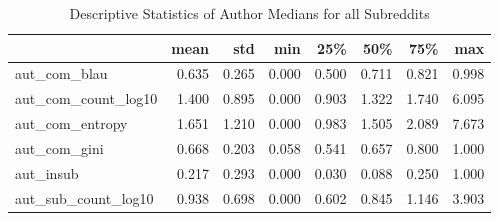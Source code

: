 \begin{table}
\centering
\begin{tabular}{lrrrrrrr}
\toprule
{} &  mean &   std &   min &   25\% &   50\% &   75\% &   max \\
\midrule
aut\_com\_blau        & 0.635 & 0.265 & 0.000 & 0.500 & 0.711 & 0.821 & 0.998 \\
aut\_com\_count\_log10 & 1.400 & 0.895 & 0.000 & 0.903 & 1.322 & 1.740 & 6.095 \\
aut\_com\_entropy     & 1.651 & 1.210 & 0.000 & 0.983 & 1.505 & 2.089 & 7.673 \\
aut\_com\_gini        & 0.668 & 0.203 & 0.058 & 0.541 & 0.657 & 0.800 & 1.000 \\
aut\_insub           & 0.217 & 0.293 & 0.000 & 0.030 & 0.088 & 0.250 & 1.000 \\
aut\_sub\_count\_log10 & 0.938 & 0.698 & 0.000 & 0.602 & 0.845 & 1.146 & 3.903 \\
\bottomrule
\end{tabular}
\caption{Descriptive Statistics of Author Medians for all Subreddits}
\label{table/author-medians:all}
\end{table}